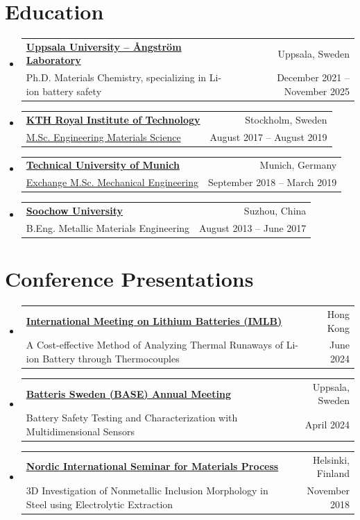 \documentclass[letterpaper,11pt]{article}
\makeatletter
\newcommand{\resumeSubheading}[4]{
  \vspace{-2pt}\item
    \begin{tabular*}{0.98\textwidth}[t]{l@{\extracolsep{\fill}}r}
      \textbf{\small #1} & {\small #2}\vspace{0pt}\\  
      {\small #3} & {\footnotesize #4}\\
    \end{tabular*}\vspace{-7pt}
}
\newcommand{\resumeSubHeadingListStart}{\begin{itemize}[leftmargin=0.15in, label={}]}
\newcommand{\resumeSubHeadingListEnd}{\end{itemize}}
\makeatother
\begin{document}
\section{Education}
  \resumeSubHeadingListStart
    \resumeSubheading
      {\href{https://www.uu.se/en/campus/angstrom-laboratory}{Uppsala University – Ångström Laboratory}}{Uppsala, Sweden}
      {Ph.D. Materials Chemistry, specializing in Li-ion battery safety}{December 2021 – November 2025}

    \resumeSubheading
      {\href{https://www.kth.se/en}{KTH Royal Institute of Technology}}{Stockholm, Sweden}
      {\href{https://www.kth.se/en/studies/master/engineering-materials-science/msc-engineering-materials-science-1.48238}{M.Sc. Engineering Materials Science}}{August 2017 – August 2019}

    \resumeSubheading
      {\href{https://www.tum.de/en/?r=1}{Technical University of Munich}}{Munich, Germany}
      {\href{https://www.tum.de/en/studies/degree-programs/detail/mechanical-engineering-master-of-science-msc}{Exchange M.Sc. Mechanical Engineering}}{September 2018 – March 2019}

    \resumeSubheading
      {\href{http://eng.suda.edu.cn}{Soochow University}}{Suzhou, China}
      {B.Eng. Metallic Materials Engineering}{August 2013 – June 2017}      
  \resumeSubHeadingListEnd


\section{Conference Presentations}
  \resumeSubHeadingListStart
\resumeSubheading
      {\href{https://www.imlb.org}{International Meeting on Lithium Batteries (IMLB)}}{Hong Kong}
      {A Cost-effective Method of Analyzing Thermal Runaways of Li-ion Battery through Thermocouples}{June 2024}

    \resumeSubheading
      {\href{https://www.batteriessweden.se/w/bs}{Batteris Sweden (BASE) Annual Meeting}}{Uppsala, Sweden}
      {Battery Safety Testing and Characterization with Multidimensional Sensors}{April 2024}

    \resumeSubheading
      {\href{https://www.kth.se/student/kurser/kurs/MH2450?l=en}{Nordic International Seminar for Materials Process}}{Helsinki, Finland}
      {3D Investigation of Nonmetallic Inclusion Morphology in Steel using Electrolytic Extraction}{November 2018}
  \resumeSubHeadingListEnd  


\end{document}
